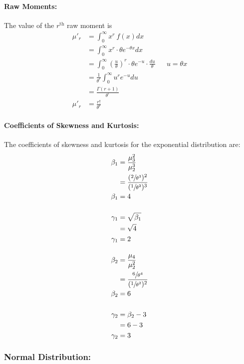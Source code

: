 \documentclass[
10pt, %
a4paper, %
]{report}
\begin{document}
\paragraph{Raw Moments:}
The value of the \(r^{\text{th}}\) raw moment is
\begin{align*}
    \mu'_r &= \int_0^\infty x^r\:f(x)dx \\
           &= \int_0^\infty x^r \cdot \theta e^{-\theta x} dx \\
           &= \int_0^\infty \left(\frac{u}{\theta}\right)^r\cdot\theta e^{-u}\cdot\frac{du}{\theta} && {u=\theta x} \\
           &= \frac{1}{\theta^r} \int_0^\infty u^r e^{-u} du \\
           &= \frac{\Gamma(r+1)}{\theta^r} \\
    \mu'_r &= \frac{r!}{\theta^r}
\end{align*}

\paragraph{Coefficients of Skewness and Kurtosis:}
The coefficients of skewness and kurtosis for the exponential distribution are:
\begin{align*}
    \beta_1 &= \frac{\mu_3^2}{\mu_2^3} \\
            &= \frac{(\sfrac{2}{\theta^3})^2}{(\sfrac{1}{\theta^2})^3} \\
    \beta_1 &= 4 \\ \\
    \gamma_1 &= \sqrt{\beta_1} \\
             &= \sqrt{4} \\
    \gamma_1 &= 2 \\ \\
    \beta_2 &= \frac{\mu_4}{\mu_2^2} \\
            &= \frac{\sfrac{6}{\theta^4}}{(\sfrac{1}{\theta^2})^2} \\
    \beta_2 &= 6 \\ \\
    \gamma_2 &= \beta_2 - 3 \\
             &= 6 - 3 \\
    \gamma_2 &= 3 \\
\end{align*}

\newpage

\subsubsection*{Normal Distribution:}
\end{document}
